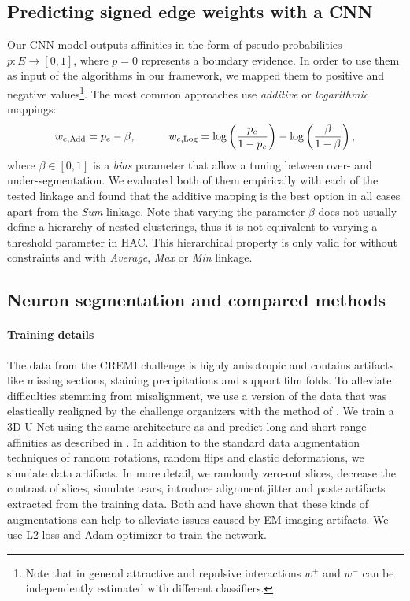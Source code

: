 \subsection{Predicting signed edge weights with a CNN}
Our CNN model outputs affinities in the form of pseudo-probabilities $p:E \rightarrow [0,1]$, where $p=0$ represents a boundary evidence. In order to use them as input of the algorithms in our framework, we mapped them to positive and negative values\footnote{Note that in general attractive and repulsive interactions $w^+$ and $w^-$ can be independently estimated with different classifiers.}. The most common approaches use \emph{additive} \cite{ailon2008aggregating} or \emph{logarithmic} \cite{finkel2008enforcing,andres2012globally} mappings:
\begin{equation} \label{eq:mappings}
w_{e,\mathrm{Add}} = p_e - \beta, \qquad \quad w_{e,\mathrm{Log}} = \log \left( \frac{p_e}{1-p_e} \right) - \log \left( \frac{\beta}{1-\beta} \right),
\end{equation}
where $\beta \in [0,1]$ is a \emph{bias} parameter that allow a tuning between over- and under-segmentation. We evaluated both of them empirically with each of the tested linkage and found that the additive mapping is the best option in all cases apart from the \emph{Sum} linkage. Note that varying the parameter $\beta$ does not usually define a hierarchy of nested clusterings, thus it is not equivalent to varying a threshold parameter in HAC. This hierarchical property is only valid for \algname{} without constraints and with \emph{Average}, \emph{Max} or \emph{Min} linkage.



\subsection{Neuron segmentation and compared methods}\label{sec:cremi_details}
\paragraph{Training details} The data from the CREMI challenge is highly anisotropic and contains artifacts like missing sections, staining precipitations and support film folds. 
To alleviate difficulties stemming from misalignment, we use a version of the data that was elastically realigned by the challenge organizers with the method of \cite{saalfeld2012elastic}.
We train a 3D U-Net \cite{ronneberger2015u, cciccek20163d} using the same architecture as \cite{funke2018large} and predict long-and-short range affinities 
as described in \cite{lee2017superhuman}. In addition to the standard data augmentation techniques of random rotations, random flips and  elastic deformations, we simulate data artifacts.
In more detail, we randomly zero-out slices, decrease the contrast of slices, simulate tears, introduce alignment jitter and paste artifacts extracted from the training data. Both \cite{funke2018large} and \cite{lee2017superhuman} have shown
that these kinds of augmentations can help to alleviate issues caused by EM-imaging artifacts.
We use L2 loss and Adam optimizer to train the network. %

